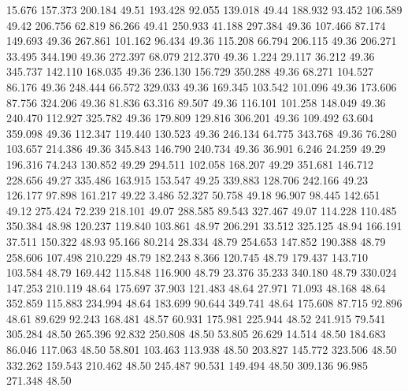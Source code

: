   15.676  157.373  200.184        49.51
 193.428   92.055  139.018        49.44
 188.932   93.452  106.589        49.42
 206.756   62.819   86.266        49.41
 250.933   41.188  297.384        49.36
 107.466   87.174  149.693        49.36
 267.861  101.162   96.434        49.36
 115.208   66.794  206.115        49.36
 206.271   33.495  344.190        49.36
 272.397   68.079  212.370        49.36
   1.224   29.117   36.212        49.36
 345.737  142.110  168.035        49.36
 236.130  156.729  350.288        49.36
  68.271  104.527   86.176        49.36
 248.444   66.572  329.033        49.36
 169.345  103.542  101.096        49.36
 173.606   87.756  324.206        49.36
  81.836   63.316   89.507        49.36
 116.101  101.258  148.049        49.36
 240.470  112.927  325.782        49.36
 179.809  129.816  306.201        49.36
 109.492   63.604  359.098        49.36
 112.347  119.440  130.523        49.36
 246.134   64.775  343.768        49.36
  76.280  103.657  214.386        49.36
 345.843  146.790  240.734        49.36
  36.901    6.246   24.259        49.29
 196.316   74.243  130.852        49.29
 294.511  102.058  168.207        49.29
 351.681  146.712  228.656        49.27
 335.486  163.915  153.547        49.25
 339.883  128.706  242.166        49.23
 126.177   97.898  161.217        49.22
   3.486   52.327   50.758        49.18
  96.907   98.445  142.651        49.12
 275.424   72.239  218.101        49.07
 288.585   89.543  327.467        49.07
 114.228  110.485  350.384        48.98
 120.237  119.840  103.861        48.97
 206.291   33.512  325.125        48.94
 166.191   37.511  150.322        48.93
  95.166   80.214   28.334        48.79
 254.653  147.852  190.388        48.79
 258.606  107.498  210.229        48.79
 182.243    8.366  120.745        48.79
 179.437  143.710  103.584        48.79
 169.442  115.848  116.900        48.79
  23.376   35.233  340.180        48.79
 330.024  147.253  210.119        48.64
 175.697   37.903  121.483        48.64
  27.971   71.093   48.168        48.64
 352.859  115.883  234.994        48.64
 183.699   90.644  349.741        48.64
 175.608   87.715   92.896        48.61
  89.629   92.243  168.481        48.57
  60.931  175.981  225.944        48.52
 241.915   79.541  305.284        48.50
 265.396   92.832  250.808        48.50
  53.805   26.629   14.514        48.50
 184.683   86.046  117.063        48.50
  58.801  103.463  113.938        48.50
 203.827  145.772  323.506        48.50
 332.262  159.543  210.462        48.50
 245.487   90.531  149.494        48.50
 309.136   96.985  271.348        48.50
